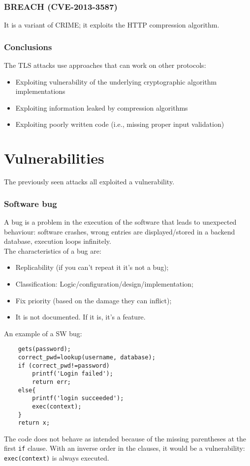 \documentclass[a4paper, 10pt, titlepage]{article}
\begin{document}
\subsubsection{BREACH (CVE-2013-3587)}
It is a variant of CRIME; it exploits the HTTP compression algorithm.

\subsubsection{Conclusions}
The TLS attacks use approaches that can work on other protocols:
\begin{itemize}
	\item Exploiting vulnerability of the underlying cryptographic algorithm implementations
	\item Exploiting information leaked by compression algorithms
	\item Exploiting poorly written code (i.e., missing proper input validation)
\end{itemize}

\newpage
\section{Vulnerabilities}
The previously seen attacks all exploited a vulnerability.

\subsubsection*{Software bug}
A bug is a problem in the execution of the software that leads to unexpected behaviour: software crashes, wrong entries are displayed/stored in a backend database, execution loops infinitely. \\
The characteristics of a bug are:
\begin{itemize}
	\item Replicability (if you can't repeat it it's not a bug);
	\item Classification: Logic/configuration/design/implementation;
	\item Fix priority (based on the damage they can inflict);
	\item It is not documented. If it is, it’s a feature.
\end{itemize}
An example of a SW bug:
\begin{lstlisting}
	gets(password);
	correct_pwd=lookup(username, database);
	if (correct_pwd!=password)
		printf('Login failed');
		return err;
	else{
		printf('login succeeded');
		exec(context);
	}
	return x;
\end{lstlisting}
The code does not behave as intended because of the missing parentheses at the first \lstinline|if| clause. With an inverse order in the clauses, it would be a vulnerability: \lstinline|exec(context)| is always executed.
\end{document}
